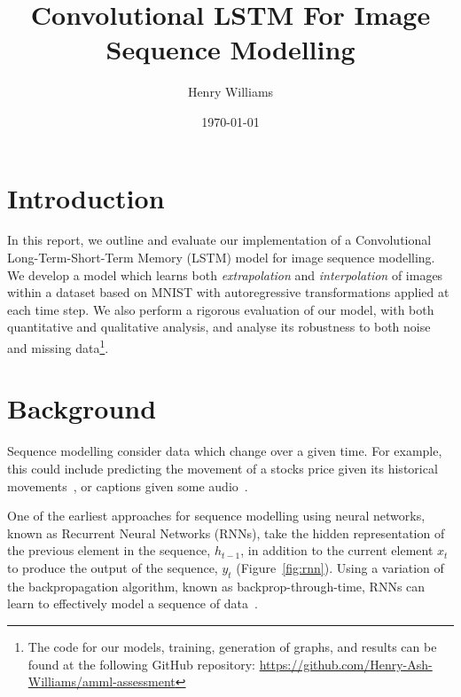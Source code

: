 \documentclass[twocolumn]{article}
\title{Convolutional LSTM For Image Sequence Modelling}
\author{Henry Williams}
\date{\today}
\begin{document}
\maketitle

\section{Introduction}

In this report, we outline and evaluate our implementation of a Convolutional Long-Term-Short-Term Memory (LSTM) model for image sequence modelling. We develop a model which learns both \emph{extrapolation} and \emph{interpolation} of images within a dataset based on MNIST with autoregressive transformations applied at each time step. We also perform a rigorous evaluation of our model, with both quantitative and qualitative analysis, and analyse its robustness to both noise and missing data\footnote{The code for our models, training, generation of graphs, and results can be found at the following GitHub repository: \url{https://github.com/Henry-Ash-Williams/amml-assessment}}. 

\section{Background}

Sequence modelling consider data which change over a given time. For example, this could include predicting the movement of a stocks price given its historical movements~\cite{nelson2017stock}, or captions given some audio~\cite{drossos2017automated}. 

One of the earliest approaches for sequence modelling using neural networks, known as Recurrent Neural Networks (RNNs), take the hidden representation of the previous element in the sequence, $h_{t-1}$, in addition to the current element $x_t$ to produce the output of the sequence, $y_t$ (Figure~\ref{fig:rnn}). Using a variation of the backpropagation algorithm, known as backprop-through-time, RNNs can learn to effectively model a sequence of data~\cite{mozer1995bptt}.
\end{document}
